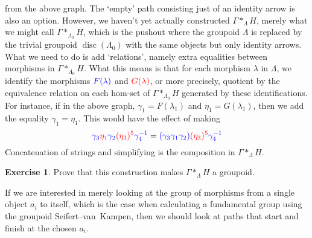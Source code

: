 \documentclass{tufte-handout}
\DeclareMathOperator{\disc}{disc}
\theoremstyle{definition}
\newtheorem{ex}{Exercise}
\begin{document}
from the above graph. The `empty' path consisting just of an identity arrow is also an 
option. However, we haven't yet actually constructed $\Gamma\ast_\Lambda H$, merely what 
we might call $\Gamma \ast_{\Lambda_0}H$, which 
is the pushout where the groupoid $\Lambda$ is replaced by the trivial groupoid 
$\disc(\Lambda_0)$ with the same objects but only identity arrows. What we need to do is 
add `relations', namely extra equalities between morphisms in $\Gamma 
\ast_{\Lambda_0}H$. What this means is that for each morphism $\lambda$ in $\Lambda$, we 
identify the morphisms ${\color{blue}F(\lambda)}$ and ${\color{red}G(\lambda)}$, or more 
precisely, quotient by the equivalence relation on each hom-set of $\Gamma 
\ast_{\Lambda_0}H$ generated by these identifications. For instance, if in the above 
graph, $\gamma_1=F(\lambda_1)$ and $\eta_1 = G(\lambda_1)$, then we add the equality 
$\gamma_1=\eta_1$. This would have the effect of making
\[
	{\color{blue}\gamma_3}{\color{red}\eta_1}{\color{blue}\gamma_2}{\color{red}(\eta_3)^5}{\color{blue}\gamma_4^{-1}} = 
	{\color{blue}(\gamma_3\gamma_1\gamma_2)}{\color{red}(\eta_3)^5}{\color{blue}\gamma_4^{-1}}	
\]
Concatenation of strings and simplifying is the composition in ${\Gamma\ast_\Lambda H}$.

\begin{ex}
Prove that this construction makes $\Gamma\ast_\Lambda H$ a groupoid.
\end{ex}

If we are interested in merely looking at the group of morphisms from a single object $a_i$ to itself,
which is the case when calculating a fundamental group using the groupoid Seifert--van~Kampen,
then we should look at paths that start and finish at the chosen $a_i$.
\end{document}
